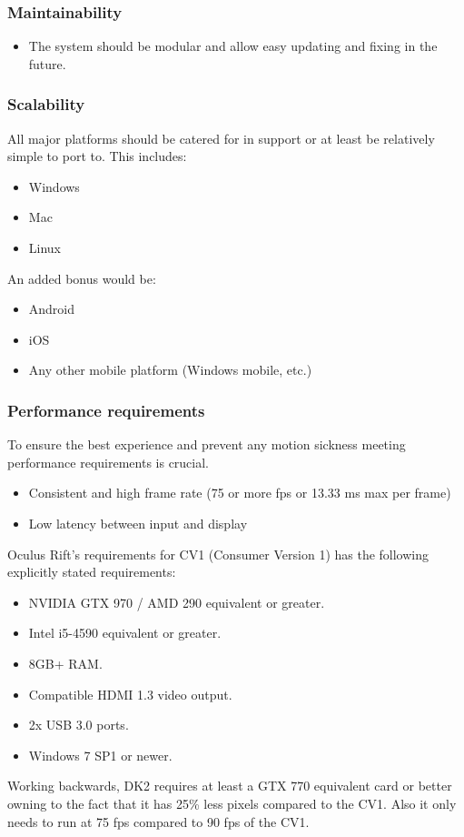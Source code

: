 \documentclass[a4paper,12pt]{article}
\begin{document}
\subsubsection{Maintainability}
	\begin{itemize}
		\item The system should be modular and allow easy updating and fixing in the future.
	\end{itemize}

\subsubsection{Scalability}
All major platforms should be catered for in support or at least be relatively simple to port to. This includes:
	\begin{itemize}
		\item Windows
		\item Mac
		\item Linux		
	\end{itemize}
An added bonus would be:
	\begin{itemize}
		\item Android
		\item iOS
		\item Any other mobile platform (Windows mobile, etc.)
	\end{itemize}
	
\subsubsection{Performance requirements}
To ensure the best experience and prevent any motion sickness meeting performance requirements is crucial.
	\begin{itemize}
		\item Consistent and high frame rate (75 or more fps or 13.33 ms max per frame)
		\item Low latency between input and display
	\end{itemize}
Oculus Rift's requirements for CV1 (Consumer Version 1) has the following explicitly stated requirements:
\begin{itemize}
	\item NVIDIA GTX 970 / AMD 290 equivalent or greater.
	\item Intel i5-4590 equivalent or greater.
	\item 8GB+ RAM.
	\item Compatible HDMI 1.3 video output.
	\item 2x USB 3.0 ports.
	\item Windows 7 SP1 or newer.
\end{itemize}
Working backwards, DK2 requires at least a GTX 770 equivalent card or better owning to the fact that it has 25\% less pixels compared to the CV1. Also it only needs to run at 75 fps compared to 90 fps of the CV1.
\end{document}
